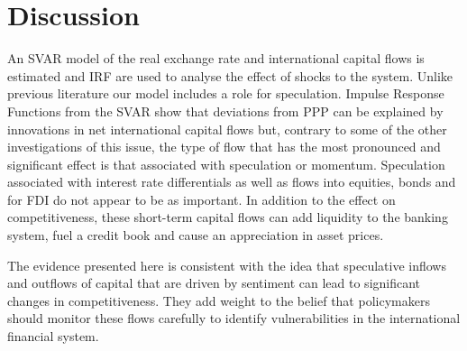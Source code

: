 \documentclass[jrfm,communication,submit,moreauthors,pdftex]{Definitions/mdpi}
\begin{document}
\section{Discussion}

An SVAR model of the real exchange rate and international capital flows is estimated and IRF are used to analyse the effect of shocks to the system.   Unlike previous literature our model includes a role for speculation. Impulse Response Functions from the SVAR show that deviations from PPP can be explained by innovations in net international capital flows but, contrary to some of the other investigations of this issue, the type of flow that has the most pronounced and significant effect is that associated with speculation or momentum. Speculation associated with interest rate differentials as well as flows into equities, bonds and for FDI do not appear to be as important. In addition to the effect on competitiveness, these short-term capital flows can add liquidity to the banking system, fuel a credit book and cause an appreciation in asset prices. 

The evidence presented here is consistent with the idea that speculative inflows and outflows of capital that are driven by sentiment can lead to significant changes in competitiveness.  They add weight to the belief that policymakers should monitor these flows carefully to identify vulnerabilities in the international financial system. 


\end{document}
